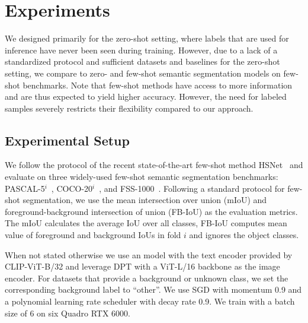 \section{Experiments}
\label{sec:experiments}
We designed \methodname{} primarily for the zero-shot setting, where labels that are used for inference have never been seen during training. However, due to a lack of a standardized protocol and sufficient datasets and baselines for the zero-shot setting, we compare \methodname{} to zero- and few-shot semantic segmentation models on few-shot benchmarks. Note that few-shot methods have access to more information and are thus expected to yield higher accuracy. However, the need for labeled samples severely restricts their flexibility compared to our approach. 


\subsection{Experimental Setup}
We follow the protocol of the recent state-of-the-art few-shot method HSNet~\citep{min2021hypercorrelation} and evaluate on three widely-used few-shot semantic segmentation benchmarks: {PASCAL-5$^i$~\citep{Everingham15}}, COCO-20$^i$~\citep{lin2014microsoft}, and FSS-1000~\citep{li2020fss}. Following a standard protocol for few-shot segmentation, we use the mean intersection over union (mIoU) and foreground-background intersection of union (FB-IoU) as the evaluation metrics. The mIoU calculates the average IoU over all classes, FB-IoU computes mean value of foreground and background IoUs in fold $i$ and ignores the object classes. 

When not stated otherwise we use an \methodname{} model with the
text encoder provided by CLIP-ViT-B/32 and leverage DPT with a ViT-L/16 backbone as the image encoder. For datasets that provide a background or unknown class, we set the corresponding background label to ``other''. We use SGD with momentum 0.9 and a polynomial learning rate scheduler with decay rate 0.9. We train with a batch size of $6$ on six Quadro RTX 6000.

\begin{table}[t]
    \centering
    
    \label{tab:fewshot_pascal}
\end{table}

\begin{table}[t]
    \centering
    
    \label{tab:fewshot_coco}
    \vspace{-0.2in}
\end{table}

